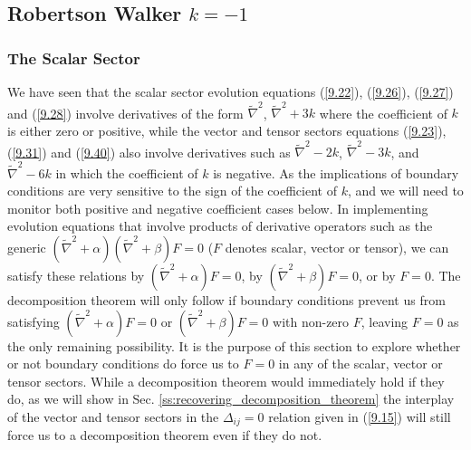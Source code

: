 \subsection{Robertson Walker $k=-1$}
\label{ss:rw_k=-1_svt3}

\subsubsection{The Scalar Sector}
\label{sss:scalar_sector}

We have seen that the scalar sector evolution equations (\ref{9.22}), (\ref{9.26}), (\ref{9.27}) and (\ref{9.28}) involve derivatives of the form $\tilde{\nabla}^2$, $\tilde{\nabla}^2+3k$ where the coefficient of $k$ is either zero or positive, while the vector and tensor sectors equations (\ref{9.23}), (\ref{9.31}) and (\ref{9.40}) also involve derivatives such as $\tilde{\nabla}^2-2k$, $\tilde{\nabla}^2-3k$, and $\tilde{\nabla}^2-6k$ in which the coefficient of $k$ is negative. As the implications of boundary conditions are very sensitive to the sign of the coefficient of $k$, and we will need to monitor both positive and negative coefficient cases below. In implementing evolution equations that involve products of derivative operators such as the generic $(\tilde{\nabla}^2+\alpha)(\tilde{\nabla}^2+\beta)F=0$ ($F$ denotes scalar, vector or tensor), we can satisfy these relations by $(\tilde{\nabla}^2+\alpha)F=0$,  by $(\tilde{\nabla}^2+\beta)F=0$, or by $F=0$. The decomposition theorem will only follow if boundary conditions prevent us from satisfying $(\tilde{\nabla}^2+\alpha)F=0$ or   $(\tilde{\nabla}^2+\beta)F=0$ with non-zero $F$, leaving $F=0$ as the only remaining possibility. It is the purpose of this section to explore whether or not boundary conditions do force us to $F=0$ in any of the scalar, vector or tensor sectors. While a decomposition theorem would immediately hold if they do, as we will show in Sec. \ref{ss:recovering_decomposition_theorem} the interplay of the vector and tensor sectors in the $\Delta_{ij}=0$ relation given in (\ref{9.15}) will still force us to a decomposition theorem even if they do not.


